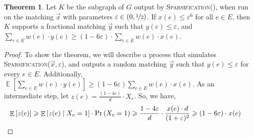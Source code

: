 \documentclass[a4paper,11pt]{article}
\DeclareMathOperator*{\Exp}{\ensuremath{{\mathbb{E}}}}
\DeclareMathOperator*{\Prob}{\ensuremath{\textnormal{Pr}}}
\renewcommand{\Pr}{\Prob}
\newcommand{\prob}[1]{\Pr\paren{#1}}
\newcommand{\paren}[1]{\left ( #1 \right )}
\newcommand{\bracket}[1]{\left [ #1 \right ]}
\newcommand{\expect}[1]{\Exp\bracket{#1}}
\newcommand{\eps}{\varepsilon}
\theoremstyle{definition}
\theoremstyle{definition}
\theoremstyle{definition}
\theoremstyle{definition}
\newtheorem{theorem2}[definition2]{Theorem}
\theoremstyle{definition}
\theoremstyle{definition}
\theoremstyle{definition}
\theoremstyle{definition}
\theoremstyle{definition}
\theoremstyle{definition}
\theoremstyle{definition}
\theoremstyle{definition}
\theoremstyle{definition}
\theoremstyle{definition}
\theoremstyle{definition}
\begin{document}
\begin{theorem2}\label{thm:largeintegral}
Let $K$ be the subgraph of $G$ output by \textsc{Sparsification}(), when run on the matching $\vec{x}$ with parameters $\eps\in (0,\nicefrac{1}{2})$. If $x(e)\leqslant \eps^6$ for all $e\in E$, then $K$ supports a fractional matching $\vec{y}$ such that $y(e)\leqslant \eps$, and $\sum_{e\in E}w(e)\cdot y(e)\geqslant (1-6\eps)\cdot \sum_{e\in E}w(e)\cdot x(e)$.
\end{theorem2}
\begin{proof}
	To show the theorem, we will describe a process that simulates \textsc{Sparsification}($\vec{x},\eps$), and outputs a random matching $\vec{y}$ such that $y(e)\leqslant \eps$ for every $e\in E$. Additionally, $\expect{\sum_{e\in E}w(e)\cdot y(e)}\geqslant (1-6\eps)\sum_{e\in E}w(e)\cdot x(e)$. As an intermediate step, let $z(e)=\frac{(1-4\eps)}{d}\cdot X_e$. So, we have,
	\begin{align*}
	\expect{z(e)}&\geqslant \expect{z(e)\mid X_e=1}\cdot \prob{X_e=1}\geqslant \frac{1-4\eps}{d}\cdot \frac{x(e)\cdot d}{(1+\eps)^2}\geqslant (1-6\eps)\cdot x(e)
	\end{align*}
	

\end{proof}
\end{document}
